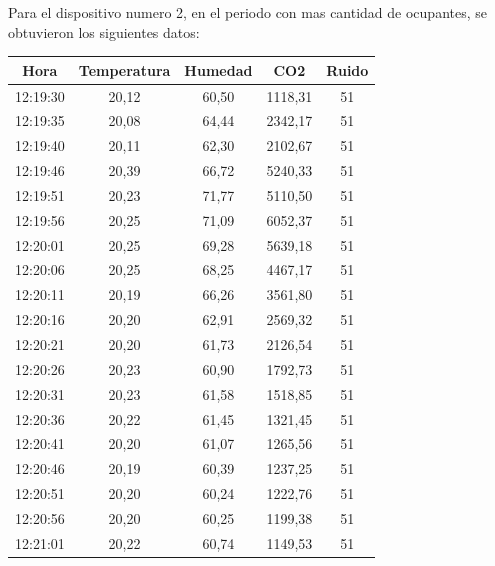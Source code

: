 \documentclass{templateNote}
\begin{document}
\newpage

\noindent Para el dispositivo numero 2, en el periodo con mas cantidad de ocupantes, se obtuvieron los siguientes datos:
    \begin{table}[H]
        \centering
        \begin{tabular}{|c|c|c|c|c|}
            \hline
            Hora     & Temperatura & Humedad & CO2 & Ruido \\ \hline
            12:19:30 & 20,12     & 60,50     & 1118,31   & 51        \\ \hline
            12:19:35 & 20,08     & 64,44     & 2342,17   & 51        \\ \hline
            12:19:40 & 20,11     & 62,30     & 2102,67   & 51        \\ \hline
            12:19:46 & 20,39     & 66,72     & 5240,33   & 51        \\ \hline
            12:19:51 & 20,23     & 71,77     & 5110,50   & 51        \\ \hline
            12:19:56 & 20,25     & 71,09     & 6052,37   & 51        \\ \hline
            12:20:01 & 20,25     & 69,28     & 5639,18   & 51        \\ \hline
            12:20:06 & 20,25     & 68,25     & 4467,17   & 51        \\ \hline
            12:20:11 & 20,19     & 66,26     & 3561,80   & 51        \\ \hline
            12:20:16 & 20,20     & 62,91     & 2569,32   & 51        \\ \hline
            12:20:21 & 20,20     & 61,73     & 2126,54   & 51        \\ \hline
            12:20:26 & 20,23     & 60,90     & 1792,73   & 51        \\ \hline
            12:20:31 & 20,23     & 61,58     & 1518,85   & 51        \\ \hline
            12:20:36 & 20,22     & 61,45     & 1321,45   & 51        \\ \hline
            12:20:41 & 20,20     & 61,07     & 1265,56   & 51        \\ \hline
            12:20:46 & 20,19     & 60,39     & 1237,25   & 51        \\ \hline
            12:20:51 & 20,20     & 60,24     & 1222,76   & 51        \\ \hline
            12:20:56 & 20,20     & 60,25     & 1199,38   & 51        \\ \hline
            12:21:01 & 20,22     & 60,74     & 1149,53   & 51        \\ \hline

\end{tabular}
\end{table}
\end{document}
